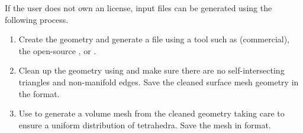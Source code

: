\begin{NoteBox}
If the user does not own an  license, input files can be
generated using the following process.
\begin{enumerate}
  \item Create the geometry and generate a  file using a tool 
        such as  (commercial), the open-source ,
        or .
  \item Clean up the geometry using  and make sure there 
        are no self-intersecting triangles and non-manifold edges.  Save the
        cleaned surface mesh geometry in the  format.
  \item Use  to generate a volume mesh from the cleaned geometry
        taking care to ensure a uniform distribution of tetrahedra.  Save
        the mesh in   format.
\end{enumerate}
\end{NoteBox}

